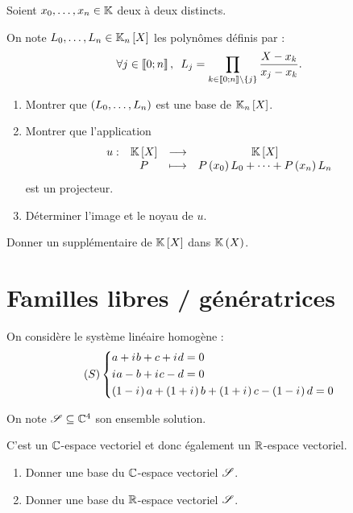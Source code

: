 \begin{exo}
Soient \(x_0,\dots,x_n\in\mathbb{K}\) deux à deux distincts.

On note \(L_0,\dots,L_n\in\polydeg{n}\) les polynômes définis par : \[\quantifs{\forall j\in\interventierii{0}{n}}L_j=\prod_{k\in\interventierii{0}{n}\excluant\accol{j}}\dfrac{X-x_k}{x_j-x_k}.\]

\begin{enumerate}
\item Montrer que \(\left(L_0,\dots,L_n\right)\) est une base de \(\polydeg{n}\). \\

\item Montrer que l'application \[\fonction{u}{\poly}{\poly}{P}{P\paren{x_0}L_0+\dots+P\paren{x_n}L_n}\] est un projecteur. \\

\item Déterminer l'image et le noyau de \(u\).
\end{enumerate}
\end{exo}

\begin{corr}
\end{corr}

\begin{exo}[Exercice 14]
Donner un supplémentaire de \(\poly\) dans \(\fracrat\).
\end{exo}

\begin{corr}
\end{corr}

\section{Familles libres / génératrices}

\begin{exo}[Exercice 15]
On considère le système linéaire homogène : \[\left(S\right)\begin{dcases}
a+i\mkern1mu b+c+i\mkern1mu d=0 \\
i\mkern1mu a-b+i\mkern1mu c-d=0 \\
\left(1-i\mkern1mu\right)a+\left(1+i\mkern1mu\right)b+\left(1+i\mkern1mu\right)c-\left(1-i\mkern1mu\right)d=0
\end{dcases}\]

On note \(\mathscr{S}\subseteq\mathbb{C}^4\) son ensemble solution.

C'est un \(\mathbb{C}\)-espace vectoriel et donc également un \(\mathbb{R}\)-espace vectoriel.

\begin{enumerate}
\item Donner une base du \(\mathbb{C}\)-espace vectoriel \(\mathscr{S}\). \\

\item Donner une base du \(\mathbb{R}\)-espace vectoriel \(\mathscr{S}\).
\end{enumerate}
\end{exo}

